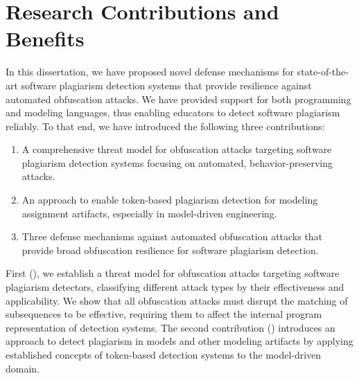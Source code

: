 

\section{Research Contributions and Benefits}
In this dissertation, we have proposed novel defense mechanisms for state-of-the-art software plagiarism detection systems that provide resilience against automated obfuscation attacks. We have provided support for both programming and modeling languages, thus enabling educators to detect software plagiarism reliably.
%
To that end, we have introduced the following three contributions: 
\begin{enumerate}[label=\textbf{C\arabic*}]
    \item A comprehensive threat model for obfuscation attacks targeting software plagiarism detection systems focusing on automated, behavior-preserving attacks.\\ { } 
    \item An approach to enable token-based plagiarism detection for modeling assignment artifacts, especially in model-driven engineering.\\ {  } 
    \item Three defense mechanisms against automated obfuscation attacks that provide broad obfuscation resilience for software plagiarism detection.\\ {   }
\end{enumerate}

First (), we establish a threat model for obfuscation attacks targeting software plagiarism detectors, classifying different attack types by their effectiveness and applicability. We show that all obfuscation attacks must disrupt the matching of subsequences to be effective, requiring them to affect the internal program representation of detection systems.
The second contribution () introduces an approach to detect plagiarism in models and other modeling artifacts by applying established concepts of token-based detection systems to the model-driven domain.

